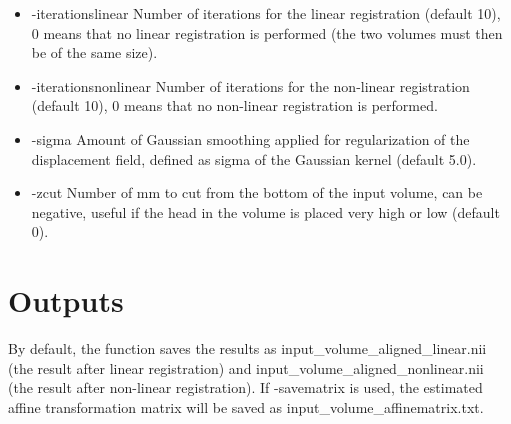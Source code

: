 \begin{itemize}

\item -iterationslinear          
\newline \newline Number of iterations for the linear registration (default 10), 0 means that no linear registration is performed (the two volumes must then be of the same size).  

\newpage

\item -iterationsnonlinear       
\newline \newline Number of iterations for the non-linear registration (default 10), 0 means that no non-linear registration is performed. 


\item -sigma                    
\newline \newline Amount of Gaussian smoothing applied for regularization of the displacement field, defined as sigma of the Gaussian kernel (default 5.0).

\item -zcut                      
\newline \newline Number of mm to cut from the bottom of the input volume, can be negative, useful if the head in the volume is placed very high or low (default 0). 

\end{itemize}

\section{Outputs}

By default, the function saves the results as input\_volume\_aligned\_linear.nii (the result after linear registration) and input\_volume\_aligned\_nonlinear.nii (the result after non-linear registration). If -savematrix is used, the estimated affine transformation matrix will be saved as input\_volume\_affinematrix.txt.

